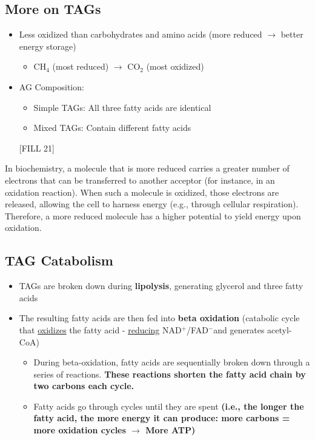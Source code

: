 \documentclass[10pt]{article}
\newcommand{\pc}{$^+$}
\newcommand{\nc}{$^-$}
\begin{document}
\subsection*{More on TAGs}
\begin{itemize}
    \item Less oxidized than carbohydrates and amino acids (more reduced $\rightarrow$ better energy storage)
    \begin{itemize}
        \item CH$_4$ (most reduced) $\rightarrow$ CO$_2$ (most oxidized)
    \end{itemize}
    \item AG Composition:
    \begin{itemize}
        \item Simple TAGs: All three fatty acids are identical
        \item Mixed TAGs: Contain different fatty acids
    \end{itemize}
    \begin{center}
        [FILL 21]
    \end{center}
\end{itemize}
In biochemistry, a molecule that is more reduced carries a greater number of electrons that can be transferred to another acceptor (for instance, in an oxidation reaction).  When such a molecule is oxidized, those electrons are released, allowing the cell to harness energy (e.g., through cellular respiration).  Therefore, a more reduced molecule has a higher potential to yield energy upon oxidation.

\subsection*{TAG Catabolism}
\begin{itemize}
    \item TAGs are broken down during \textbf{lipolysis}, generating glycerol and three fatty acids
    \item The resulting fatty acids are then fed into \textbf{beta oxidation} (catabolic cycle that \underline{oxidizes} the fatty acid - \underline{reducing} NAD\pc/FAD\nc and generates acetyl-CoA)
    \begin{itemize}
        \item During beta-oxidation, fatty acids are sequentially broken down through a series of reactions.  \textbf{These reactions shorten the fatty acid chain by two carbons each cycle.}
        \item Fatty acids go through cycles until they are spent \textbf{(i.e., the longer the fatty acid, the more energy it can produce: more carbons = more oxidation cycles $\rightarrow$ More ATP)}
    \end{itemize}
\end{itemize}
\end{document}
